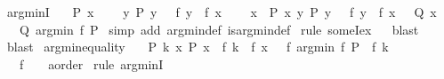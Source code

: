 \begin{isabellebody}
\isanewline
{}\isamarkupfalse%
\ arg{\isacharunderscore}{\kern0pt}minI{\isacharcolon}{\kern0pt}\isanewline
\ \ {\isachardoublequoteopen}{\isasymlbrakk}\ P\ x{\isacharsemicolon}{\kern0pt}\isanewline
\ \ \ \ {\isasymAnd}y{\isachardot}{\kern0pt}\ P\ y\ {\isasymLongrightarrow}\ {\isasymnot}\ f\ y\ {\isacharless}{\kern0pt}\ f\ x{\isacharsemicolon}{\kern0pt}\isanewline
\ \ \ \ {\isasymAnd}x{\isachardot}{\kern0pt}\ {\isasymlbrakk}\ P\ x{\isacharsemicolon}{\kern0pt}\ {\isasymforall}y{\isachardot}{\kern0pt}\ P\ y\ {\isasymlongrightarrow}\ {\isasymnot}\ f\ y\ {\isacharless}{\kern0pt}\ f\ x\ {\isasymrbrakk}\ {\isasymLongrightarrow}\ Q\ x\ {\isasymrbrakk}\isanewline
\ \ {\isasymLongrightarrow}\ Q\ {\isacharparenleft}{\kern0pt}arg{\isacharunderscore}{\kern0pt}min\ f\ P{\isacharparenright}{\kern0pt}{\isachardoublequoteclose}\isanewline
%
\isadelimproof
%
\endisadelimproof
%
\isatagproof
{}\isamarkupfalse%
\ {\isacharparenleft}{\kern0pt}simp\ add{\isacharcolon}{\kern0pt}\ arg{\isacharunderscore}{\kern0pt}min{\isacharunderscore}{\kern0pt}def\ is{\isacharunderscore}{\kern0pt}arg{\isacharunderscore}{\kern0pt}min{\isacharunderscore}{\kern0pt}def{\isacharparenright}{\kern0pt}\isanewline
{}\isamarkupfalse%
\ {\isacharparenleft}{\kern0pt}rule\ someI{}{\isacharunderscore}{\kern0pt}ex{\isacharparenright}{\kern0pt}\isanewline
\ \isamarkupfalse%
\ blast\isanewline
{}\isamarkupfalse%
\ blast\isanewline
{}\isamarkupfalse%
%
\endisatagproof
{\isafoldproof}%
%
\isadelimproof
\isanewline
%
\endisadelimproof
\isanewline
{}\isamarkupfalse%
\ arg{\isacharunderscore}{\kern0pt}min{\isacharunderscore}{\kern0pt}equality{\isacharcolon}{\kern0pt}\isanewline
\ \ {\isachardoublequoteopen}{\isasymlbrakk}\ P\ k{\isacharsemicolon}{\kern0pt}\ {\isasymAnd}x{\isachardot}{\kern0pt}\ P\ x\ {\isasymLongrightarrow}\ f\ k\ {\isasymle}\ f\ x\ {\isasymrbrakk}\ {\isasymLongrightarrow}\ f\ {\isacharparenleft}{\kern0pt}arg{\isacharunderscore}{\kern0pt}min\ f\ P{\isacharparenright}{\kern0pt}\ {\isacharequal}{\kern0pt}\ f\ k{\isachardoublequoteclose}\isanewline
\ \ \ f\ {\isacharcolon}{\kern0pt}{\isacharcolon}{\kern0pt}\ {\isachardoublequoteopen}{\isacharunderscore}{\kern0pt}\ {\isasymRightarrow}\ {\isacharprime}{\kern0pt}a{\isacharcolon}{\kern0pt}{\isacharcolon}{\kern0pt}order{\isachardoublequoteclose}\isanewline
%
\isadelimproof
%
\endisadelimproof
%
\isatagproof
{}\isamarkupfalse%
\ {\isacharparenleft}{\kern0pt}rule\ arg{\isacharunderscore}{\kern0pt}minI{\isacharparenright}{\kern0pt}\isanewline

\end{isabellebody}
